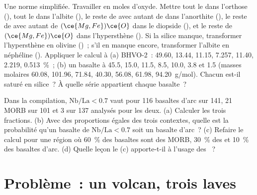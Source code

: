 \begin{exercise}[$\star\star\star$]\label{exo:b2:magmatic-series:11}
Une norme simplifiée. Travailler en moles d'oxyde. Mettre tout le  dans l'orthose
(), tout le  dans l'albite (), le reste de
 avec autant de  dans l'anorthite (), le reste de
 avec autant de $(\ce{Mg,Fe})\ce{O}$ dans le diopside
(), et le reste de $(\ce{Mg,Fe})\ce{O}$ dans l'hypersthène
(). Si la silice manque, transformer l'hypersthène en olivine
()~; s'il en manque encore, transformer l'albite en néphéline
(). Appliquer le calcul à (a) BHVO-2~:  49.60,  13.44,
 11.15,  7.257,  11.40,  2.219, 
\qty{0.513}{\percent}~; (b) un basalte à 45.5, 15.0, 11.5, 8.5, 10.0, 3.8 et 1.5 (masses molaires
 60.08,  101.96,  71.84,  40.30, 
56.08,  61.98,  \qty{94.20}{g/mol}). Chacun est-il saturé en silice~? À quelle
série appartient chaque basalte~?
\end{exercise}

\begin{exercise}[$\star\star\star$]\label{exo:b2:magmatic-series:12}
Dans la compilation, $\mathrm{Nb}/\mathrm{La} < 0.7$ vaut pour 116 basaltes d'arc sur 141,
21 MORB sur 101 et 3  sur 137 analysés pour les deux. (a) Calculer les
trois fractions. (b) Avec des proportions égales des trois contextes, quelle est la
probabilité qu'un basalte de $\mathrm{Nb}/\mathrm{La} < 0.7$ soit un basalte d'arc~? (c)
Refaire le calcul pour une région où \qty{60}{\percent} des basaltes sont des MORB, \qty{30}{\percent}
des  et \qty{10}{\percent} des basaltes d'arc. (d) Quelle leçon le (c)
apporte-t-il à l'usage des ~?
\end{exercise}

\section{Problème~: un volcan, trois laves}


